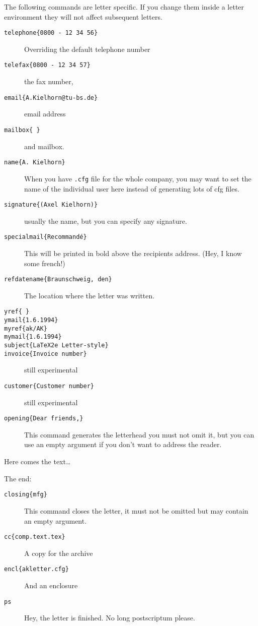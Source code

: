 \documentclass[a4paper]{article}
\begin{document}
The following commands are letter specific. If you change them 
inside a letter environment they will not affect subsequent letters.

\begin{description}
\item [\texttt{telephone\{0800 - 12 34 56\}}] Overriding the default 
telephone number
\item [\texttt{telefax\{0800 - 12 34 57\}}] the fax number,
\item [\texttt{email\{A.Kielhorn@tu-bs.de\}}] email address
\item [\texttt{mailbox\{ \}}] and mailbox.
\item [\texttt{name\{A. Kielhorn\}}] When you have \texttt{.cfg} file for the 
whole company, you may want to set the name of the individual user 
here instead of generating lots of cfg files.
\item [\texttt{signature\{(Axel Kielhorn)\}}] usually the name, but 
you can specify any signature.
\item [\texttt{specialmail\{Recommand\'e\}}] This will be printed in 
bold above the recipients address. (Hey, I know some french!) 
\item [\texttt{refdatename\{Braunschweig, den\}}] The location where 
the letter was written. 
\item [\texttt{yref\{ \}}]
\item [\texttt{ymail\{1.6.1994\}}]
\item [\texttt{myref\{ak/AK\}}]
\item [\texttt{mymail\{1.6.1994\}}]
\item [\texttt{subject\{LaTeX2e Letter-style\}}] 
\item [\texttt{invoice\{Invoice number\}}] still experimental
\item [\texttt{customer\{Customer number\}}] still experimental
\item [\texttt{opening\{Dear friends,\}}] This command generates the 
letterhead you must not omit it, but you can use an empty argument if 
you don't want to address the reader.

\end{description}

Here comes the text\dots

The end:
\begin{description}
\item [\texttt{closing\{mfg\}}] This command closes the letter, it 
must not be omitted but may contain an empty argument.
\item [\texttt{cc\{comp.text.tex\}}] A copy for the archive
\item [\texttt{encl\{akletter.cfg\}}] And an enclosure
\item [\texttt{ps}] Hey, the letter is finished. No long postscriptum 
please.
\end{description}
\end{document}
